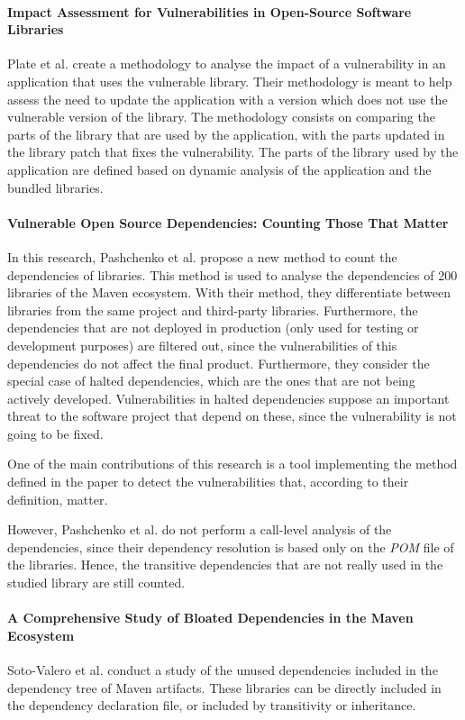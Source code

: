 \paragraph{Impact Assessment for Vulnerabilities in Open-Source Software Libraries \cite{plate2015impact}}
Plate et al. create a methodology to analyse the impact of a vulnerability in an application that uses the vulnerable library. Their methodology is meant to help assess the need to update the application with a version which does not use the vulnerable version of the library.
The methodology consists on comparing the parts of the library that are used by the application, with the parts updated in the library patch that fixes the vulnerability. The parts of the library used by the application are defined based on dynamic analysis of the application and the bundled libraries.

\paragraph{Vulnerable Open Source Dependencies: Counting Those That Matter \cite{pashchenko2018vulnerable}} %
In this research, Pashchenko et al. propose a new method to count the dependencies of libraries. This method is used to analyse the dependencies of 200 libraries of the Maven ecosystem. With their method, they differentiate between libraries from the same project and third-party libraries. Furthermore, the dependencies that are not deployed in production (only used for testing or development purposes) are filtered out, since the vulnerabilities of this dependencies do not affect the final product. Furthermore, they consider the special case of halted dependencies, which are the ones that are not being actively developed. Vulnerabilities in halted dependencies suppose an important threat to the software project that depend on these, since the vulnerability is not going to be fixed.

One of the main contributions of this research is a tool implementing the method defined in the paper to detect the vulnerabilities that, according to their definition, matter.

However, Pashchenko et al. do not perform a call-level analysis of the dependencies, since their dependency resolution is based only on the \textit{POM} file of the libraries. Hence, the transitive dependencies that are not really used in the studied library are still counted.

\paragraph{A Comprehensive Study of Bloated Dependencies in the Maven Ecosystem \cite{soto2020comprehensive}}
Soto-Valero et al. conduct a study of the unused dependencies included in the dependency tree of Maven artifacts. These libraries can be directly included in the dependency declaration file, or included by transitivity or inheritance.


